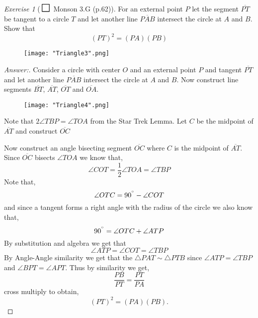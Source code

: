 \documentclass[12pt]{amsart}
\theoremstyle{remark}
\newtheorem*{exercise}{Exercise}%
\theoremstyle{mycomment}
\def\msquare{\mathord{\scalerel*{\Box}{gX}}}
\begin{document}
\begin{exercise}[$\msquare$ Monson 3.G (p.62)] For an external point $P$ let the segment $\overline{PT}$ be tangent to a circle $T$ and let another line $\overline{PAB}$ intersect the circle at $A$ and $B$. Show that
\begin{equation*}
(PT)^2 = (PA)(PB)
\end{equation*}
\begin{figure}[H]
\centering
\texttt{[image: "Triangle3".png]}
\end{figure}

\begin{proof}[Answer:] Consider a circle with center $O$ and an external point $P$ and tangent  $\overline{PT}$ and let another line $\overline{PAB}$ intersect the circle at $A$ and $B$. Now construct line segments $\overline{BT}$, $\overline{AT}$, $\overline{OT}$ and $\overline{OA}$. 

\begin{figure}[H]
\centering
\texttt{[image: "Triangle4".png]}
\end{figure}




Note that $2 \angle TBP = \angle TOA$ from the Star Trek Lemma. Let $C$ be the midpoint of $\overline{AT}$ and construct $\overline{OC}$





Now construct an angle bisecting segment $\overline{OC}$ where $C$ is the midpoint of $\overline{AT}$. Since $\overline{OC}$ bisects $\angle TOA$ we know that,
\begin{equation*}
\angle COT =  \frac{1}{2}\angle TOA = \angle TBP
\end{equation*}
Note that,
\begin{equation*}
\angle OTC = 90^{\degree} - \angle COT
\end{equation*}
and since a tangent forms a right angle with the radius of the circle we also know that,
\begin{equation*}
90^{\degree} = \angle OTC + \angle ATP
\end{equation*}
By substitution and algebra we get that 
\begin{equation*}
\angle ATP = \angle COT = \angle TBP
\end{equation*}
By Angle-Angle similarity we get that the $\triangle PAT \sim \triangle PTB$ since $\angle ATP = \angle TBP$ and $\angle BPT = \angle APT$. Thus by similarity we get,
\begin{equation*}
\frac{PB}{PT} = \frac{PT}{PA}
\end{equation*}
cross multiply to obtain,
\begin{equation*}
(PT)^2 = (PA)(PB).
\end{equation*}












\end{proof}
\end{exercise}
\end{document}
